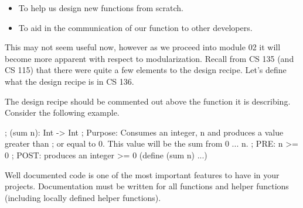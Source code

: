 \begin{itemize}

\item To help us design new functions from scratch.
\item To aid in the communication of our function to other developers.

\end{itemize}

This may not seem useful now, however as we proceed into module 02 it will become more apparent with respect to modularization. Recall from CS 135 (and CS 115) that there were quite a few elements to the design recipe. Let's define what the design recipe is in CS 136.\\


The design recipe should be commented out above the function it is describing. Consider the following example.\\


\begin{code}[Lisp]
; (sum n): Int -> Int
; Purpose: Consumes an integer, n and produces a value greater than
;          or equal to 0. This value will be the sum from 0 ... n.
; PRE: n >= 0
; POST: produces an integer >= 0
(define (sum n)
	...)
\end{code}

Well documented code is one of the most important features to have in your projects. Documentation must be written for all functions and helper functions (including locally defined helper functions).